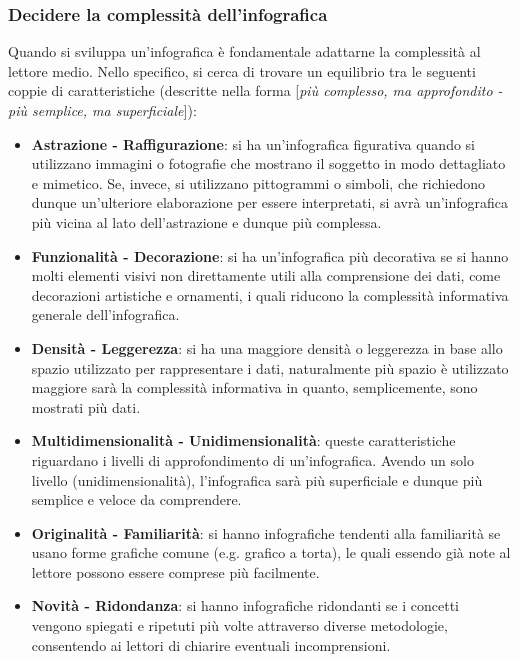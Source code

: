 \subsubsection{Decidere la complessità dell'infografica}
Quando si sviluppa un'infografica è fondamentale adattarne la complessità al lettore medio.
Nello specifico, si cerca di trovare un equilibrio tra le seguenti coppie di caratteristiche (descritte nella forma [\emph{più complesso, ma approfondito - più semplice, ma superficiale}]):
\begin{itemize}
    \item \textbf{Astrazione - Raffigurazione}: si ha un'infografica figurativa quando si utilizzano immagini o fotografie che mostrano il soggetto in modo dettagliato e mimetico. Se, invece, si utilizzano
    pittogrammi o simboli, che richiedono dunque un'ulteriore elaborazione per essere interpretati, si avrà un'infografica più vicina al lato dell'astrazione e dunque più complessa. 
    \item \textbf{Funzionalità - Decorazione}: si ha un'infografica più decorativa se si hanno molti elementi visivi non direttamente utili alla comprensione dei dati, come decorazioni artistiche e ornamenti, i quali
    riducono la complessità informativa generale dell'infografica.
    \item \textbf{Densità - Leggerezza}: si ha una maggiore densità o leggerezza in base allo spazio utilizzato per rappresentare i dati, naturalmente più spazio è utilizzato maggiore sarà
    la complessità informativa in quanto, semplicemente, sono mostrati più dati.
    \item \textbf{Multidimensionalità - Unidimensionalità}: queste caratteristiche riguardano i livelli di approfondimento di un'infografica. Avendo un solo livello (unidimensionalità), l'infografica sarà più
    superficiale e dunque più semplice e veloce da comprendere.
    \item \textbf{Originalità - Familiarità}: si hanno infografiche tendenti alla familiarità se usano forme grafiche comune (e.g. grafico a torta), le quali essendo già note al lettore possono essere comprese più facilmente.
    \item \textbf{Novità - Ridondanza}: si hanno infografiche ridondanti se i concetti vengono spiegati e ripetuti più volte attraverso diverse metodologie, consentendo ai lettori di chiarire eventuali incomprensioni.
\end{itemize}

